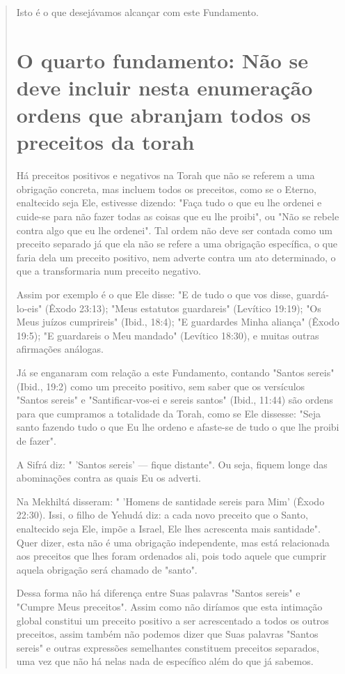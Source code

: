 \begin{quote}
Isto é o que desejávamos alcançar com este Fundamento.

\chapter{O quarto fundamento:
Não se deve incluir nesta enumeração ordens que abranjam todos os
preceitos da torah}

Há preceitos positivos e negativos na Torah que não se referem a uma
obrigação concreta, mas incluem todos os preceitos, como se o Eterno,
enaltecido seja Ele, estivesse dizendo: "Faça tudo o que eu lhe ordenei
e cuide-se para não fazer todas as coisas que eu lhe proibi", ou "Não se
rebele contra algo que eu lhe ordenei". Tal ordem não deve ser contada
como um preceito separado já que ela não se refere a uma obrigação
específica, o que faria dela um preceito positivo, nem adverte contra um
ato determinado, o que a trans­formaria num preceito negativo.

Assim por exemplo é o que Ele disse: "E de tudo o que vos disse,
guardá-lo-eis" (Êxodo 23:13); "Meus estatutos guardareis" (Levítico
19:19); "Os Meus juízos cumprireis" (Ibid., 18:4); "E guardardes Minha
aliança" (Êxodo 19:5); "E guardareis o Meu mandado" (Levítico 18:30), e
muitas outras afirmações aná­logas.

Já se enganaram com relação a este Fundamento, contando "Santos sereis"
(Ibid., 19:2) como um preceito positivo, sem saber que os versículos
"Santos sereis" e "Santificar-vos-ei e sereis santos" (Ibid., 11:44) são
ordens para que cumpramos a totalidade da Torah, como se Ele dissesse:
"Seja santo fazendo tudo o que Eu lhe ordeno e afaste-se de tudo o que
lhe proibi de fazer".

A Sifrá diz: " 'Santos sereis' --- fique distante". Ou seja, fiquem
lon­ge das abominações contra as quais Eu os adverti.

Na Mekhiltá disseram: " 'Homens de santidade sereis para Mim' (Êxo­do
22:30). Issi, o filho de Yehudá diz: a cada novo preceito que o Santo,
enalte­cido seja Ele, impõe a Israel, Ele lhes acrescenta mais
santidade". Quer dizer, esta não é uma obrigação independente, mas está
relacionada aos preceitos que lhes foram ordenados ali, pois todo aquele
que cumprir aquela obrigação será chamado de "santo".

Dessa forma não há diferença entre Suas palavras "Santos sereis" e
"Cumpre Meus preceitos". Assim como não diríamos que esta intimação
glo­bal constitui um preceito positivo a ser acrescentado a todos os
outros precei­tos, assim também não podemos dizer que Suas palavras
"Santos sereis" e ou­tras expressões semelhantes constituem preceitos
separados, uma vez que não há nelas nada de específico além do que já
sabemos.


\end{quote}
